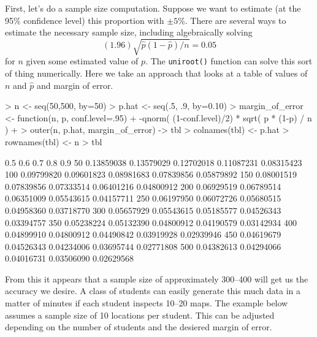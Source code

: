 First, let's do a sample size computation.  Suppose we want to 
estimate (at the 95\% confidence level) this proportion with $\pm 5$\%.
There are several ways to estimate the necessary sample size, including
algebraically solving
\[
(1.96) \sqrt{ \hat p (1-\hat p) /n} = 0.05
\]
for $n$ given some estimated value of $p$.  The \verb!uniroot()! function
can solve this sort of thing numerically.  Here we take an approach 
that looks at a table of values of $n$ and $\hat p$ and margin of error.
\begin{Schunk}
\begin{Sinput}
> n <- seq(50,500, by=50)
> p.hat <- seq(.5, .9, by=0.10)
> margin_of_error <- function(n, p, conf.level=.95) { 
+ 	-qnorm( (1-conf.level)/2) * sqrt( p * (1-p) / n ) 
+ }
> outer(n, p.hat, margin_of_error) -> tbl
> colnames(tbl) <- p.hat
> rownames(tbl) <- n
> tbl
\end{Sinput}
\begin{Soutput}
           0.5        0.6        0.7        0.8        0.9
50  0.13859038 0.13579029 0.12702018 0.11087231 0.08315423
100 0.09799820 0.09601823 0.08981683 0.07839856 0.05879892
150 0.08001519 0.07839856 0.07333514 0.06401216 0.04800912
200 0.06929519 0.06789514 0.06351009 0.05543615 0.04157711
250 0.06197950 0.06072726 0.05680515 0.04958360 0.03718770
300 0.05657929 0.05543615 0.05185577 0.04526343 0.03394757
350 0.05238224 0.05132390 0.04800912 0.04190579 0.03142934
400 0.04899910 0.04800912 0.04490842 0.03919928 0.02939946
450 0.04619679 0.04526343 0.04234006 0.03695744 0.02771808
500 0.04382613 0.04294066 0.04016731 0.03506090 0.02629568
\end{Soutput}
\end{Schunk}
From this it appears that a sample size of approximately 300--400 will get
us the accuracy we desire.  A class of students can easily generate
this much data in a matter of minutes if each student inspects 10--20 maps.
The example below assumes a sample size of 10 locations per student.
This can be adjusted depending on the number of students and the desiered
margin of error.

